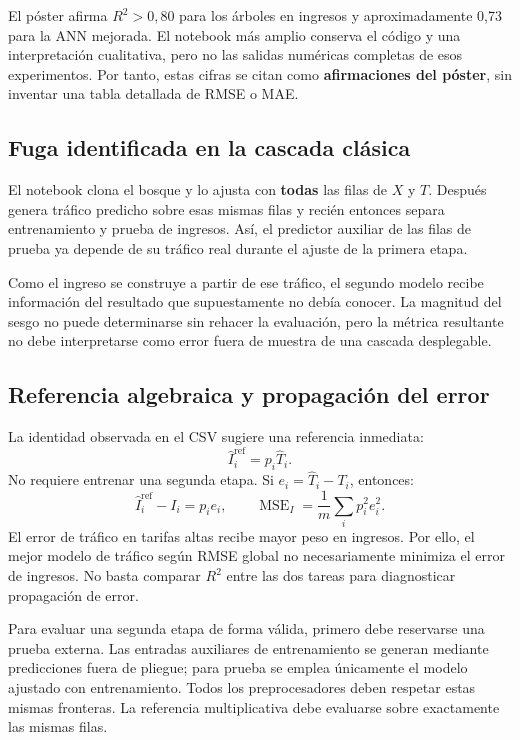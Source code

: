 \documentclass[11pt,a4paper]{article}
\begin{document}
El póster afirma $R^2>0,80$ para los árboles en ingresos y aproximadamente 0,73 para la ANN mejorada. El notebook más amplio conserva el código y una interpretación cualitativa, pero no las salidas numéricas completas de esos experimentos. Por tanto, estas cifras se citan como \textbf{afirmaciones del póster}, sin inventar una tabla detallada de RMSE o MAE.

\subsection{Fuga identificada en la cascada clásica}
El notebook clona el bosque y lo ajusta con \textbf{todas} las filas de $X$ y $T$. Después genera tráfico predicho sobre esas mismas filas y recién entonces separa entrenamiento y prueba de ingresos. Así, el predictor auxiliar de las filas de prueba ya depende de su tráfico real durante el ajuste de la primera etapa.

Como el ingreso se construye a partir de ese tráfico, el segundo modelo recibe información del resultado que supuestamente no debía conocer. La magnitud del sesgo no puede determinarse sin rehacer la evaluación, pero la métrica resultante no debe interpretarse como error fuera de muestra de una cascada desplegable.

\subsection{Referencia algebraica y propagación del error}
La identidad observada en el CSV sugiere una referencia inmediata:
\[
\hat I_i^{\mathrm{ref}}=p_i\hat T_i.
\]
No requiere entrenar una segunda etapa. Si $e_i=\hat T_i-T_i$, entonces:
\[
\hat I_i^{\mathrm{ref}}-I_i=p_ie_i,\qquad
\operatorname{MSE}_I=\frac1m\sum_i p_i^2e_i^2.
\]
El error de tráfico en tarifas altas recibe mayor peso en ingresos. Por ello, el mejor modelo de tráfico según RMSE global no necesariamente minimiza el error de ingresos. No basta comparar $R^2$ entre las dos tareas para diagnosticar propagación de error.

Para evaluar una segunda etapa de forma válida, primero debe reservarse una prueba externa. Las entradas auxiliares de entrenamiento se generan mediante predicciones fuera de pliegue; para prueba se emplea únicamente el modelo ajustado con entrenamiento. Todos los preprocesadores deben respetar estas mismas fronteras. La referencia multiplicativa debe evaluarse sobre exactamente las mismas filas.
\par\medskip
\end{document}
